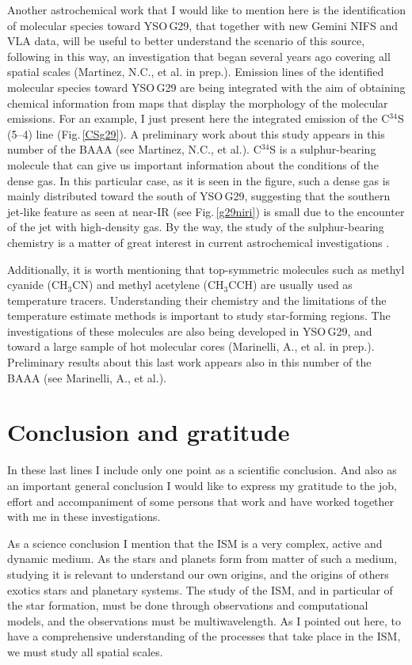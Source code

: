 \documentclass[baaa]{baaa}
\begin{document}
Another astrochemical work that I would like to mention here is the identification of molecular species toward YSO\,G29, that together with new Gemini NIFS and VLA data, will be useful to better understand the scenario of this source, following in this way, an investigation that began several years ago covering all spatial scales (Martinez, N.C., et al. in prep.). Emission lines of the identified molecular species toward YSO\,G29 are being integrated with the aim of obtaining chemical information from maps that display the morphology of the molecular emissions. For an example, I just present here the integrated emission of the C$^{34}$S (5--4) line (Fig.\,\ref{CSg29}). A preliminary work about this study appears in this number of the BAAA (see Martinez, N.C., et al.). C$^{34}$S is a sulphur-bearing molecule that can give us important information about the conditions of the dense gas. In this particular case, as it is seen in the figure, such a dense gas is mainly distributed toward the south of YSO\,G29, suggesting that the southern jet-like feature as seen at near-IR (see Fig.\,\ref{g29niri}) is small due to the encounter of the jet with high-density gas. By the way, the study of the sulphur-bearing chemistry is a matter of great interest in current astrochemical investigations \citep{fontani23}.

Additionally, it is worth mentioning that top-symmetric molecules such as methyl cyanide (CH$_3$CN) and methyl acetylene (CH$_3$CCH) are usually used as temperature tracers. Understanding their chemistry and the limitations of the temperature estimate methods is important to study star-forming regions. The investigations of these molecules are also being developed in YSO\,G29, and toward a large sample of hot molecular cores (Marinelli, A., et al. in prep.). Preliminary results about this last work appears also in this number of the BAAA (see Marinelli, A., et al.).


\section{Conclusion and gratitude} 

In these last lines I include only one point as a scientific conclusion. And also as an important general conclusion I would like to express my gratitude to the job, effort and accompaniment of some persons that work and have worked together with me in these investigations. 

As a science conclusion I mention that the ISM is a very complex, active and dynamic medium. As the stars and planets form from matter of such a medium, studying it is relevant to understand our own origins, and the origins of others exotics stars and planetary systems. The study of the ISM, and in particular of the star formation, must be done through observations and computational models, and the observations must be multiwavelength. As I pointed out here, to have a comprehensive understanding of the processes that take place in the ISM, we must study all spatial scales. 
\end{document}
